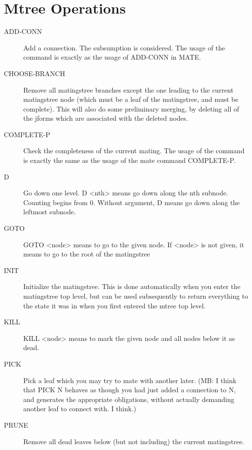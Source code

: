 \section{Mtree Operations}

\begin{description} 
\item[ADD-CONN]  
Add a connection. The subsumption is considered.
The usage of the command is exactly as the usage of ADD-CONN in MATE.

\item[CHOOSE-BRANCH]  
Remove all matingstree branches except the one leading to the 
current matingstree node (which must be a leaf of the matingstree, and must
be complete). This will also do some preliminary merging, by deleting all 
of the jforms which are associated with the deleted nodes.

\item[COMPLETE-P]  
Check the completeness of the current mating. The usage of the command is 
exactly the same as the usage of the mate command COMPLETE-P.

\item[D]  
Go down one level. D <nth> means go down along the nth subnode.
Counting begins from 0. Without argument, D means go down along the 
leftmost subnode.

\item[GOTO]  
GOTO <node> means to go to the given node. If <node> is not given,
it means to go to the root of the matingstree

\item[INIT]  
Initialize the matingstree. This is done automatically 
when you enter the matingstree top level, but can be used 
subsequently to return everything to the state it was in when 
you first entered the mtree top level.

\item[KILL]  
KILL <node> means to mark the given node and 
all nodes below it as dead.

\item[PICK]  
Pick a leaf which you may try to mate with another later.
(MB: I think that PICK N behaves as though you had just 
added a connection to N, and generates the appropriate
obligations, without actually demanding another leaf to
connect with. I think.)

\item[PRUNE]  
Remove all dead leaves below (but not including) 
the current matingstree.


\end{description}

